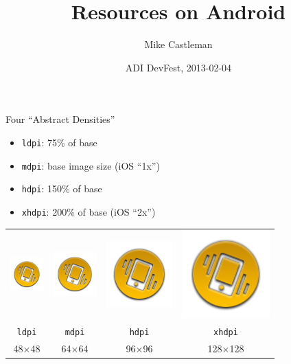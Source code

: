 \documentclass{beamer}
\title[Android Resources]{Resources on Android}
\author{Mike Castleman}
\institute{Meetup}
\date[DevFest 2013]{ADI DevFest, 2013-02-04}
\begin{document}
\begin{frame}
  \titlepage
\end{frame}


\begin{frame}{Four ``Abstract Densities''}
\begin{itemize}
\item \texttt{ldpi}: 75\% of base
\item \texttt{mdpi}: base image size (iOS ``1x'')
\item \texttt{hdpi}: 150\% of base
\item \texttt{xhdpi}: 200\% of base (iOS ``2x'')
\end{itemize}
\begin{tabular}{cccc}
\includegraphics[scale=0.5]{jogdial_l.png} &
\includegraphics[scale=0.5]{jogdial_m.png} &
\includegraphics[scale=0.5]{jogdial_h.png} &
\includegraphics[scale=0.5]{jogdial_xh.png} \\
\texttt{ldpi} & \texttt{mdpi} & \texttt{hdpi} & \texttt{xhdpi} \\
48×48 & 64×64 & 96×96 & 128×128
\end{tabular}
\end{frame}
\end{document}

